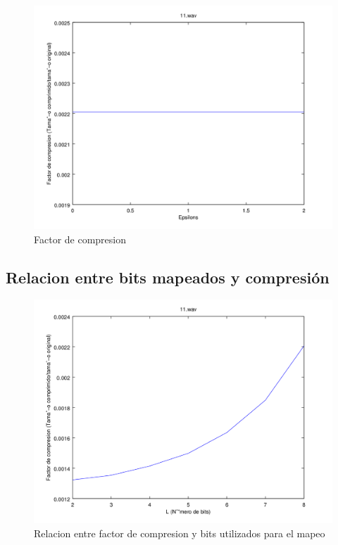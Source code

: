 \documentclass[spanish]{scrartcl}
\begin{document}
\begin{figure}[!htbp]
    \centering
    \includegraphics[interpolate=false, scale=0.09]{plots/11_epsi_compression}
    \caption{Factor de compresion}
    \label{fig:comp_fact}
\end{figure}

\subsection{Relacion entre bits mapeados y compresión}

\begin{figure}[!htbp]
    \centering
    \includegraphics[interpolate=false, scale=0.09]{plots/11_bits_compression}
    \caption{Relacion entre factor de compresion y bits utilizados para el mapeo}
    \label{fig:fact_bits}
\end{figure}
\end{document}
